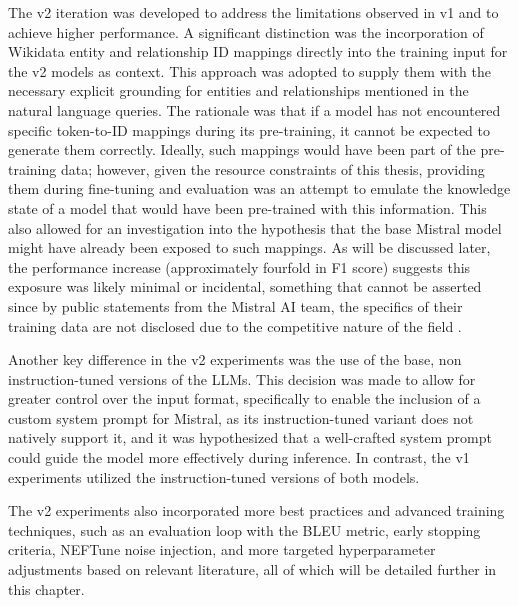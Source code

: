 The v2 iteration was developed to address the limitations observed in v1 and to achieve higher performance.
A significant distinction was the incorporation of Wikidata entity and relationship ID mappings directly into the training input for the v2 models as context.
This approach was adopted to supply them with the necessary explicit grounding for entities and relationships mentioned in the natural language queries.
The rationale was that if a model has not encountered specific token-to-ID mappings during its pre-training, it cannot be expected to generate them correctly.
Ideally, such mappings would have been part of the pre-training data; however, given the resource constraints of this thesis, providing them during fine-tuning and evaluation was an attempt to emulate the knowledge state of a model that would have been pre-trained with this information.
This also allowed for an investigation into the hypothesis that the base Mistral model might have already been exposed to such mappings.
As will be discussed later, the performance increase (approximately fourfold in F1 score) suggests this exposure was likely minimal or incidental, something that cannot be asserted since by public statements from the Mistral AI team, the specifics of their training data are not disclosed due to the competitive nature of the field \cite{Arthurmensch_HF_MistralData_2023}.

Another key difference in the v2 experiments was the use of the base, non instruction-tuned versions of the LLMs.
This decision was made to allow for greater control over the input format, specifically to enable the inclusion of a custom system prompt for Mistral, as its instruction-tuned variant does not natively support it, and it was hypothesized that a well-crafted system prompt could guide the model more effectively during inference.
In contrast, the v1 experiments utilized the instruction-tuned versions of both models.

The v2 experiments also incorporated more best practices and advanced training techniques, such as an evaluation loop with the BLEU metric, early stopping criteria, NEFTune noise injection, and more targeted hyperparameter adjustments based on relevant literature, all of which will be detailed further in this chapter.


